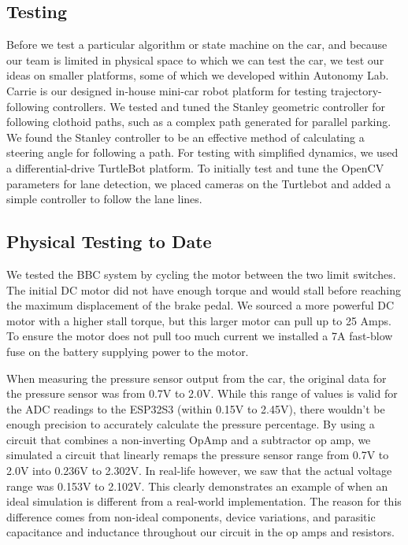 \subsection{Testing}

Before we test a particular algorithm or state machine on the car, and
because our team is limited in physical space to which we can test the
car, we test our ideas on smaller platforms, some of which we developed
within Autonomy Lab. Carrie is our designed in-house mini-car robot
platform for testing trajectory-following controllers. We tested and
tuned the Stanley geometric controller for following clothoid paths,
such as a complex path generated for parallel parking. We found the
Stanley controller to be an effective method of calculating a steering
angle for following a path. For testing with simplified dynamics, we
used a differential-drive TurtleBot platform. To initially test and
tune the OpenCV parameters for lane detection, we placed cameras on the
Turtlebot and added a simple controller to follow the lane lines.

\subsection{Physical Testing to Date}

We tested the BBC system by cycling the motor between the two limit
switches. The initial DC motor did not have enough torque and would
stall before reaching the maximum displacement of the brake pedal. We
sourced a more powerful DC motor with a higher stall torque, but this
larger motor can pull up to 25 Amps. To ensure the motor does not pull
too much current we installed a 7A fast-blow fuse on the battery
supplying power to the motor.

When measuring the pressure sensor output from the car, the original
data for the pressure sensor was from 0.7V to 2.0V. While this range of
values is valid for the ADC readings to the ESP32S3 (within 0.15V to
2.45V), there wouldn’t be enough precision to accurately calculate the
pressure percentage. By using a circuit that combines a non-inverting
OpAmp and a subtractor op amp, we simulated a circuit that linearly
remaps the pressure sensor range from 0.7V to 2.0V into 0.236V to
2.302V. In real-life however, we saw that the actual voltage range was
0.153V to 2.102V. This clearly demonstrates an example of when an ideal
simulation is different from a real-world implementation. The reason
for this difference comes from non-ideal components, device variations,
and parasitic capacitance and inductance throughout our circuit in the
op amps and resistors.

